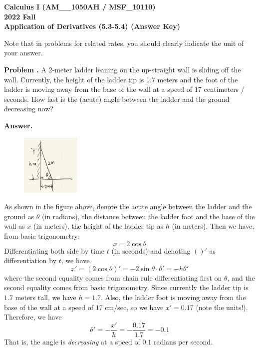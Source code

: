 \documentclass[11pt,letterpaper]{article}
\newcounter{problem}
\newcommand{\problem}{
	\stepcounter{problem}%
	\noindent \textbf{Problem \theproblem. }%
}
\newcommand{\answer}{\noindent \textbf{Answer. }}
\begin{document}
\noindent\textbf{\large Calculus I (AM\_\_1050AH / MSF\_10110) \\ 2022 Fall \\ Application of Derivatives (5.3-5.4) (Answer Key)}

\bigskip

\noindent Note that in problems for related rates, you should clearly indicate the unit of your answer. 
\bigskip

\problem A 2-meter ladder leaning on the up-straight wall is sliding off the wall.  Currently, the height of the ladder tip is 1.7 meters and the foot of the ladder is moving away from the base of the wall at a speed of 17 centimeters / seconds.  How fast is the (acute) angle between the ladder and the ground decreasing now? \vspace{6mm}

\answer 

\begin{figure}[h]
    \centering
    \includegraphics[width = 0.25\textwidth]{../graph/A12_Sol_1.png}
\end{figure}

\noindent As shown in the figure above, denote the acute angle between the ladder and the ground as $\theta$ (in radians), the distance between the ladder foot and the base of the wall as $x$ (in meters), the height of the ladder tip as $h$ (in meters).  Then we have, from basic trigonometry:
\[x = 2\cos \theta\]
Differentiating both side by time $t$ (in seconds) and denoting $()'$ as differentiation by $t$, we have
\[x' = (2\cos\theta)' = -2\sin\theta\cdot\theta' = -h\theta' \]
where the second equality comes from chain rule differentiating first on $\theta$, and the second equality comes from basic trigonometry.  Since currently the ladder tip is $1.7$ meters tall, we have $h = 1.7$.  Also, the ladder foot is moving away from the base of the wall at a speed of $17$ cm/sec, so we have $x' = 0.17$ (note the units!).  Therefore, we have
\[\theta' = -\frac{x'}{h} = -\frac{0.17}{1.7} = -0.1\]
That is, the angle is \textit{decreasing} at a speed of $0.1$ radians per second.\vspace{6mm}
\end{document}
